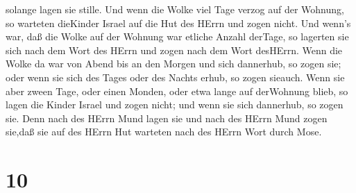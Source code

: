 solange lagen sie stille.  Und wenn die Wolke viel Tage
verzog auf der Wohnung, so warteten dieKinder Israel auf die Hut des
HErrn und zogen nicht.  Und wenn's war, daß die Wolke auf
der Wohnung war etliche Anzahl derTage, so lagerten sie sich nach dem
Wort des HErrn und zogen nach dem Wort desHErrn.  Wenn die
Wolke da war von Abend bis an den Morgen und sich dannerhub, so zogen
sie; oder wenn sie sich des Tages oder des Nachts erhub, so zogen
sieauch.  Wenn sie aber zween Tage, oder einen Monden, oder
etwa lange auf derWohnung blieb, so lagen die Kinder Israel und zogen
nicht; und wenn sie sich dannerhub, so zogen sie.  Denn
nach des HErrn Mund lagen sie und nach des HErrn Mund zogen sie,daß sie
auf des HErrn Hut warteten nach des HErrn Wort durch Mose.

\hypertarget{section-9}{%
\section{10}\label{section-9}}


